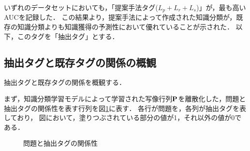 いずれのデータセットにおいても，「提案手法タグ($L_p + L_r + L_s$)」が，最も高いAUCを記録した．
この結果より，提案手法によって作成された知識分類が，既存の知識分類よりも知識獲得の予測性において優れていることが示された．
以下，このタグを「抽出タグ」とする．


\subsection{抽出タグと既存タグの関係の概観}
抽出タグと既存タグの関係を概観する．

まず，知識分類学習モデルによって学習された写像行列${\bf P}$を離散化した，問題と抽出タグの関係性を表す行列を図\ref{fig:Discrete}に表す．
各行が問題を，各列が抽出タグを表しており，
図において，塗りつぶされている部分の値が1，それ以外の値が0である．

\begin{figure}[htb]
\begin{center}
\hspace*{-20pt}
\end{center}
\caption{問題と抽出タグの関係性}
\label{fig:Discrete}
\end{figure}


